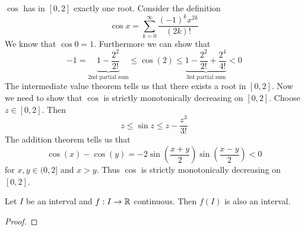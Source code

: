 \documentclass[../script.tex]{subfiles}
\begin{document}
\begin{eg}
    $\cos$ has in $[0, 2]$ exactly one root. Consider the definition 
    \[
        \cos x = \sum_{k = 0}^{\infty} \frac{(-1)^k x^{2k}}{(2k)!}
    \]
    We know that $\cos 0 = 1$. Furthermore we can show that 
    \[
        -1 = \underbrace{1 - \frac{2^2}{2!}}_{\text{2nd partial sum}} \le \cos(2) \le \underbrace{1 - \frac{2^2}{2!} + \frac{2^4}{4!}}_{\text{3rd partial sum}} < 0
    \]
    The intermediate value theorem tells us that there exists a root in $[0, 2]$. Now we need to show that $\cos$ is strictly monotonically decreasing on $[0, 2]$.
    Choose $z \in [0, 2]$. Then 
    \[
        z \le \sin z \le z - \frac{z^3}{3!}
    \]
    The addition theorem tells us that 
    \[
        \cos(x) - \cos(y) = -2 \sin\left(\frac{x+y}{2}\right) \sin\left(\frac{x-y}{2}\right) < 0
    \]
    for $x, y \in (0, 2]$ and $x > y$. Thus $\cos$ is strictly monotonically decreasing on $[0, 2]$.
\end{eg}

\begin{cor}
    Let $I$ be an interval and $f: I \rightarrow \mathbb{R}$ continuous. Then $f(I)$ is also an interval.
\end{cor}
\begin{proof}
    \reader
\end{proof}
\end{document}
